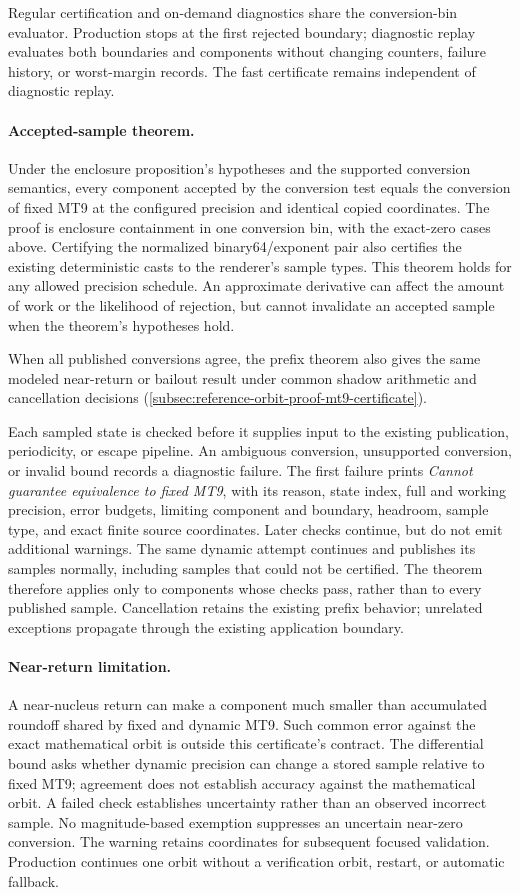 Regular certification and on-demand diagnostics share the conversion-bin evaluator.
Production stops at the first rejected boundary; diagnostic replay evaluates both
boundaries and components without changing counters, failure history, or worst-margin
records. The fast certificate remains independent of diagnostic replay.

\paragraph{Accepted-sample theorem.}
Under the enclosure proposition's hypotheses and the supported conversion
semantics, every component accepted by the conversion test equals the
conversion of fixed MT9 at the configured precision and identical copied
coordinates. The proof is enclosure containment in one conversion bin, with the exact-zero cases above.
Certifying the normalized binary64/exponent pair also certifies the existing
deterministic casts to the renderer's sample types. This theorem holds for
any allowed precision schedule. An approximate derivative can affect the
amount of work or the likelihood of rejection, but cannot invalidate an
accepted sample when the theorem's hypotheses hold.

When all published conversions agree, the prefix theorem also gives the
same modeled near-return or bailout result under common shadow arithmetic
and cancellation decisions (\cref{subsec:reference-orbit-proof-mt9-certificate}).

Each sampled state is checked before it supplies input to the existing
publication, periodicity, or escape pipeline. An ambiguous conversion, unsupported
conversion, or invalid bound records a diagnostic failure. The first failure
prints \emph{Cannot guarantee equivalence to fixed MT9}, with its reason, state
index, full and working precision, error budgets, limiting component and boundary,
headroom, sample type, and exact finite source coordinates. Later checks continue,
but do not emit additional warnings.
The same dynamic attempt continues and publishes its samples normally,
including samples that could not be certified. The theorem therefore applies
only to components whose checks pass, rather than to every published sample.
Cancellation retains the existing prefix behavior; unrelated exceptions propagate
through the existing application boundary.

\paragraph{Near-return limitation.}
A near-nucleus return can make a component much smaller than accumulated
roundoff shared by fixed and dynamic MT9. Such common error against the exact
mathematical orbit is outside this certificate's contract. The differential
bound asks whether dynamic precision can change a stored sample relative to
fixed MT9; agreement does not establish accuracy against the mathematical orbit.
A failed check establishes uncertainty rather than an observed incorrect sample.
No magnitude-based exemption suppresses an uncertain near-zero conversion.
The warning retains coordinates for subsequent focused validation. Production
continues one orbit without a verification orbit, restart, or automatic fallback.

